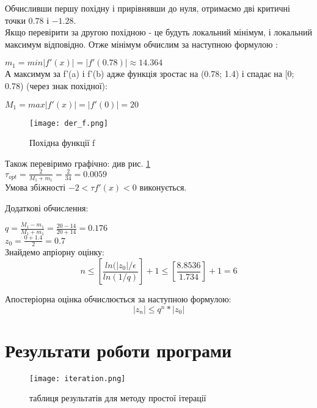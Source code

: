 \documentclass[a4paper, 12pt]{article}
\begin{document}
Обчисливши першу похідну і прирівнявши до нуля, отримаємо дві критичні точки $0.78$ і $-1.28$. \\

Якщо перевірити за другою похідною - це будуть локальний мінімум, і локальний максимум відповідно.
Отже мінімум обчислим за наступною формулою :

$m_{1} = min|f'(x)| = |f'(0.78)| \approx 14.364$
\\[0.25ex]

А максимум за f'(a) і f'(b) адже функція зростає на (0.78; 1.4) і спадає на [0; 0.78) (через знак похідної):

$M_{1} = max|f'(x)| = |f'(0)| = 20$
\\[0.25ex]

\begin{figure}[h]
	\centering
	\texttt{[image: der\_f.png]}
	\caption{Похідна функції f}
	\label{fig:der_f}
\end{figure}

Також перевіримо графічно: див рис. \ref{fig:der_f}\\


$\tau_{opt} = \frac{2}{M_{1} + m_{1}} = \frac{2}{34} = 0.0059$
\\[0.25ex]


Умова збіжності $-2 < \tau f'(x) < 0$ виконується.

Додаткові обчислення:

$q = \frac{M_{1} - m_{1}}{M_{1} + m_{1}} = \frac{20 - 14}{20 + 14} = 0.176$
\\[0.25ex]

$z_{0} = \frac{0 + 1.4}{2} = 0.7$
\\[0.25ex]

Знайдемо апріорну оцінку: \\
\[
	n \leq [\frac{ln(|z_{0}|/\epsilon}{ln(1/q)}] + 1 \leq [\frac{8.8536}{1.734}] + 1 = 6
\]

Апостеріорна оцінка обчислюється за наступною формулою: \\
\[
	\left| z_n \right| \leq  q^n * \left| z_0 \right|
\]

\newpage

\section{Результати роботи програми}

\begin{figure}[h]
	\centering
	\texttt{[image: iteration.png]}
	\caption{таблиця результатів для методу простої ітерації}
\end{figure}
\end{document}
